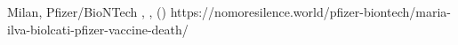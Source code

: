           {
            Milan, 
          }
          {
          }
          {
            Pfizer/BioNTech
          }
          {
            ,
          }
          {
            ,
             ()
          }
          {
            https://nomoresilence.world/pfizer-biontech/maria-ilva-biolcati-pfizer-vaccine-death/
          }


